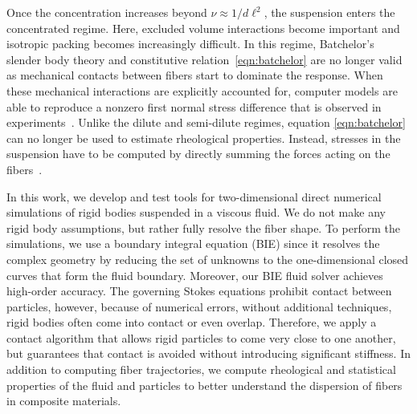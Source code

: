 \documentclass[preprint, 10pt]{elsarticle}
\begin{document}
Once the concentration increases beyond $\nu \approx 1/d\ell^2$, the
suspension enters the concentrated regime. Here, excluded volume
interactions become important and isotropic packing becomes increasingly
difficult. In this regime, Batchelor's slender body theory and
constitutive relation~\eqref{eqn:batchelor} are no longer valid as
mechanical contacts between fibers start to dominate the response. When
these mechanical interactions are explicitly accounted for, computer
models are able to reproduce a nonzero first normal stress difference
that is observed in experiments~\cite{Sundararajakumar1997, Ausias2006,
Lindstroem2008}. Unlike the dilute and semi-dilute regimes, equation
\eqref{eqn:batchelor} can no longer be used to estimate rheological
properties. Instead, stresses in the suspension have to be computed by
directly summing the forces acting on the fibers~\cite{Ausias2006,
Lindstroem2008}.

In this work, we develop and test tools for two-dimensional direct
numerical simulations of rigid bodies suspended in a viscous fluid.  We
do not make any rigid body assumptions, but rather fully resolve the
fiber shape.  To perform the simulations, we use a boundary integral
equation (BIE) since it resolves the complex geometry by reducing the
set of unknowns to the one-dimensional closed curves that form the fluid
boundary.  Moreover, our BIE fluid solver achieves high-order accuracy.
The governing Stokes equations prohibit contact between particles,
however, because of numerical errors, without additional techniques,
rigid bodies often come into contact or even overlap. Therefore, we
apply a contact algorithm that allows rigid particles to come very close
to one another, but guarantees that contact is avoided without
introducing significant stiffness.  In addition to computing fiber
trajectories, we compute rheological and statistical properties of the
fluid and particles to better understand the dispersion of fibers in
composite materials.
\end{document}
